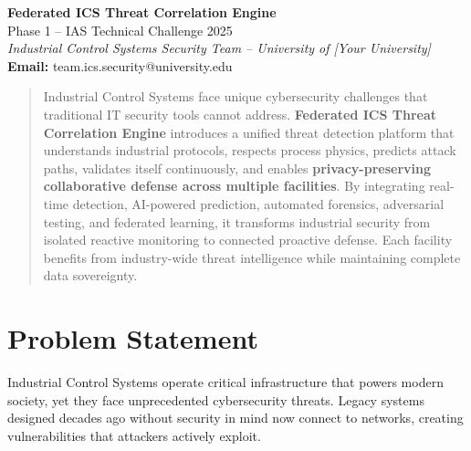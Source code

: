 \documentclass[12pt,a4paper]{article}
\begin{document}
\begin{center}
    \vspace*{0.3cm}
    {\Huge \textbf{Federated ICS Threat Correlation Engine}}\\[0.3cm]
    {\Large Phase 1 – IAS Technical Challenge 2025}\\[0.3cm]
    \textit{Industrial Control Systems Security Team – University of [Your University]}\\[0.1cm]
    \textbf{Email:} team.ics.security@university.edu\\
    \vspace{0.5cm}
\end{center}

\begin{abstract}
Industrial Control Systems face unique cybersecurity challenges that traditional IT security tools cannot address.
\textbf{Federated ICS Threat Correlation Engine} introduces a unified threat detection platform that understands industrial protocols, respects process physics, predicts attack paths, validates itself continuously, and enables \textbf{privacy-preserving collaborative defense across multiple facilities}.
By integrating real-time detection, AI-powered prediction, automated forensics, adversarial testing, and federated learning, it transforms industrial security from isolated reactive monitoring to connected proactive defense.
Each facility benefits from industry-wide threat intelligence while maintaining complete data sovereignty.
\end{abstract}

\section{Problem Statement}
Industrial Control Systems operate critical infrastructure that powers modern society, yet they face unprecedented cybersecurity threats.
Legacy systems designed decades ago without security in mind now connect to networks, creating vulnerabilities that attackers actively exploit.
\end{document}
